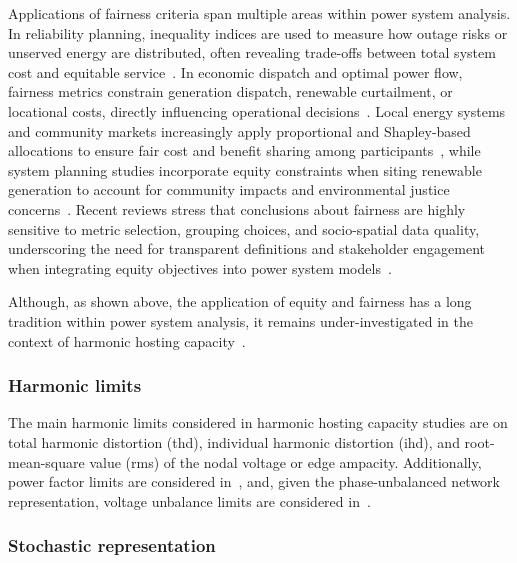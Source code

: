 Applications of fairness criteria span multiple areas within power system analysis. In reliability planning, inequality indices are used to measure how outage risks or unserved energy are distributed, often revealing trade-offs between total system cost and equitable service~\cite{heylen_fairness_2019}. In economic dispatch and optimal power flow, fairness metrics constrain generation dispatch, renewable curtailment, or locational costs, directly influencing operational decisions~\cite{sun_gini_2020}. Local energy systems and community markets increasingly apply proportional and Shapley-based allocations to ensure fair cost and benefit sharing among participants~\cite{obrien_shapley_2015}, while system planning studies incorporate equity constraints when siting renewable generation to account for community impacts and environmental justice concerns~\cite{lohr_integration_2024}. Recent reviews stress that conclusions about fairness are highly sensitive to metric selection, grouping choices, and socio-spatial data quality, underscoring the need for transparent definitions and stakeholder engagement when integrating equity objectives into power system models~\cite{goforth_incorporating_2025}.

Although, as shown above, the application of equity and fairness has a long tradition within power system analysis, it remains under-investigated in the context of harmonic hosting capacity~\cite{santos_considerations_2015}.

\subsubsection{Harmonic limits}
\label{sec:harmonic_limits}

The main harmonic limits considered in harmonic hosting capacity studies are on total harmonic distortion (thd), individual harmonic distortion (ihd), and root-mean-square value (rms) of the nodal voltage or edge ampacity. Additionally, power factor limits are considered in~\cite{sakar_integration_2018}, and, given the phase-unbalanced network representation, voltage unbalance limits are considered in~\cite{carmelito_hosting_2023}.

\subsubsection{Stochastic representation}
\label{sec:stochastic_representation}

